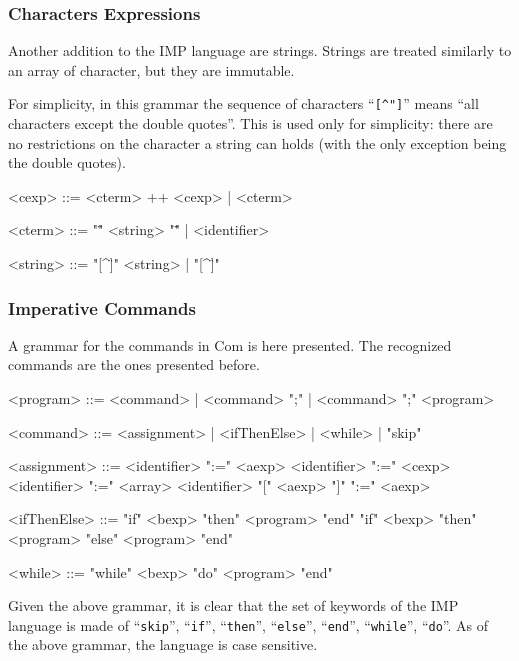 \documentclass{esposito-documentation}
\begin{document}
\subsubsection{Characters Expressions}\label{sec:grammar-cexp}

Another addition to the IMP language are strings. Strings are treated similarly
to an array of character, but they are immutable.

For simplicity, in this grammar the sequence of characters ``\texttt{[\^{}"]}''
means ``all characters except the double quotes''. This is used only for
simplicity: there are no restrictions on the character a string can holds (with
the only exception being the double quotes).

\begin{grammar}
	<cexp> ::= <cterm> ++ <cexp> | <cterm>

	<cterm> ::= "\"" <string> "\"" | <identifier>

	<string> ::= "[^\"]" <string> | "[^\"]"
\end{grammar}


\subsubsection{Imperative Commands}\label{sec:grammar-com}

A grammar for the commands in $\mathrm{Com}$ is here presented. The recognized
commands are the ones presented before.

\begin{grammar}
	<program> ::= <command> | <command> ";" | <command> ";" <program>

	<command> ::= <assignment> | <ifThenElse> | <while> | "skip"

	<assignment> ::= <identifier> ":=" <aexp>
	\alt <identifier> ":=" <cexp>
	\alt <identifier> ":=" <array>
	\alt <identifier> "[" <aexp> "]" ":=" <aexp>

	<ifThenElse> ::= "if" <bexp> "then" <program> "end"
	\alt "if" <bexp> "then" <program> "else" <program> "end"

	<while> ::= "while" <bexp> "do" <program> "end"
\end{grammar}

Given the above grammar, it is clear that the set of keywords of the IMP
language is made of ``\texttt{skip}'', ``\texttt{if}'', ``\texttt{then}'',
``\texttt{else}'', ``\texttt{end}'', ``\texttt{while}'', ``\texttt{do}''. As of
the above grammar, the language is case sensitive.
\end{document}
